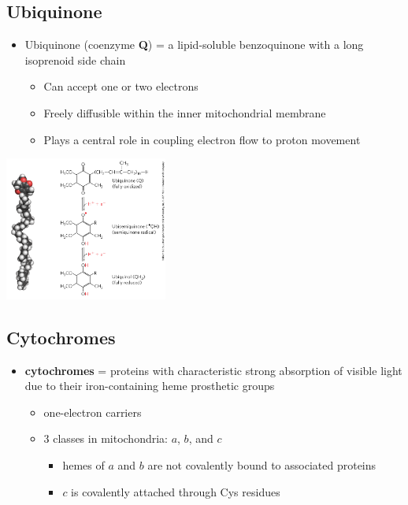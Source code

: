 \documentclass[10pt]{article}
\begin{document}
\subsection*{Ubiquinone}
\begin{itemize}
	\item Ubiquinone (coenzyme \textbf{Q}) = a lipid-soluble benzoquinone with a long isoprenoid side chain
	\begin{itemize}
        \item Can accept one or two electrons
        \item Freely diffusible within the inner mitochondrial membrane
        \item Plays a central role in coupling electron flow to proton movement
    \end{itemize}
\end{itemize}
\begin{center} 
	\includegraphics*[width=0.4\textwidth]{L1_7.png}
\end{center}

\subsection*{Cytochromes}
\begin{itemize}
	\item \textbf{cytochromes} = proteins with characteristic strong absorption of visible light due to their iron-containing heme prosthetic groups
	\begin{itemize}
        \item one-electron carriers
        \item 3 classes in mitochondria: $a$, $b$, and $c$
        \begin{itemize}
            \item hemes of $a$ and $b$ are not covalently bound to associated proteins
            \item $c$ is covalently attached through Cys residues
        \end{itemize}
    \end{itemize}
\end{itemize}
\end{document}
